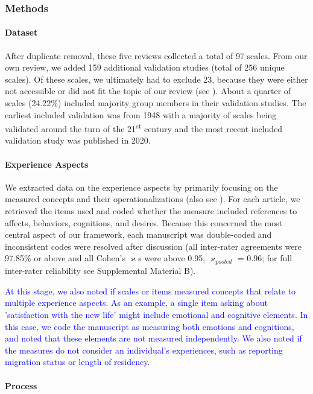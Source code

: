 \subsubsection{Methods}  
\paragraph{Dataset}

After duplicate removal, these five reviews collected a total of 97
scales. From our own review, we added 159 additional validation studies
(total of 256 unique scales). Of these scales, we ultimately had to
exclude 23, because they were either not accessible or did not fit the
topic of our review (see ). About a
quarter of scales (24.22\%) included majority group members in their
validation studies. The earliest included validation was from 1948 with
a majority of scales being validated around the turn of the
21\textsuperscript{st} century and the most recent included validation
study was published in 2020.

\paragraph{Experience Aspects}

We extracted data on the experience aspects by primarily focusing on the
measured concepts and their operationalizations (also see
). For each article, we retrieved the items
used and coded whether the measure included references to affects,
behaviors, cognitions, and desires. Because this concerned the most
central aspect of our framework, each manuscript was double-coded and
inconsistent codes were resolved after discussion (all inter-rater
agreements were 97.85\% or above and all Cohen's \(\varkappa\)s were
above 0.95, \(\varkappa_{pooled}\) = 0.96; for full inter-rater
reliability see Supplemental Material B).

\textcolor{blue}{At this stage, we also noted if scales or items measured concepts that relate to multiple experience aspects. As an example, a single item asking about 'satisfaction with the new life' might include emotional and cognitive elements. In this case, we code the manuscript as measuring both emotions and cognitions, and noted that these elements are not measured independently. We also noted if the measures do not consider an individual's experiences, such as reporting migration status or length of residency.}

\paragraph{Process}


